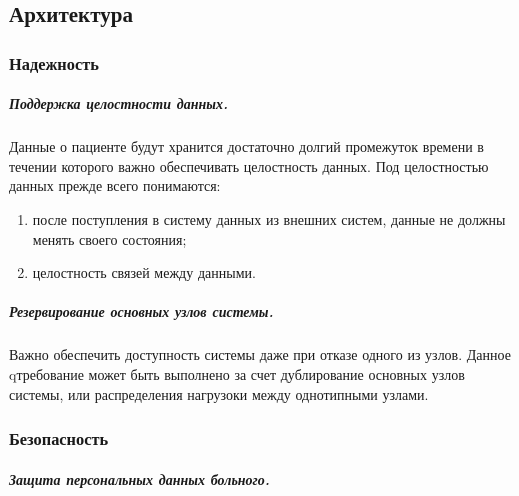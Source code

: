 \subsection{Архитектура}

\subsubsection{Надежность}
\subparagraph{Поддержка целостности данных.}
Данные о пациенте будут хранится достаточно долгий промежуток времени в течении которого важно обеспечивать целостность данных. Под целостностью данных прежде всего понимаются:

\begin{enumerate}
  \item после поступления в систему данных из внешних систем, данные не должны
  менять своего состояния;
  \item целостность связей между данными. 
\end{enumerate}

\subparagraph{Резервирование основных узлов системы.}
Важно обеспечить доступность системы даже при отказе одного из узлов. Данное
qтребование может быть выполнено за счет дублирование основных узлов системы,
или распределения нагрузоки между однотипными узлами.

\subsubsection{Безопасность}
\subparagraph{Защита персональных данных больного.}

